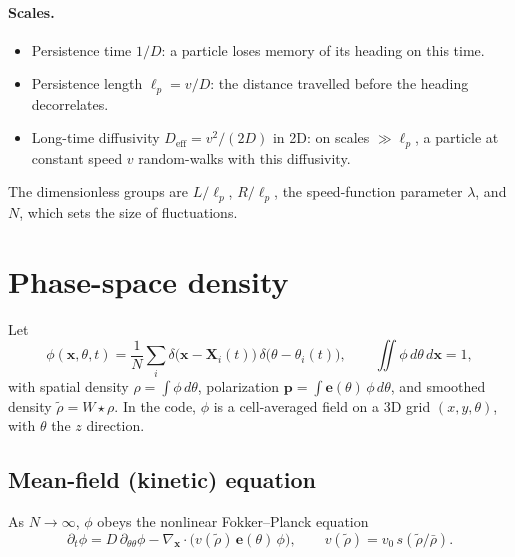 \documentclass[11pt]{article}
\newcommand{\e}{\mathbf{e}}
\newcommand{\rt}{\tilde\rho}
\newcommand{\rb}{\bar\rho}
\begin{document}
\paragraph{Scales.}
\begin{itemize}
  \item Persistence time $1/D$: a particle loses memory of its heading on this
        time.
  \item Persistence length $\ell_p = v/D$: the distance travelled before the
        heading decorrelates.
  \item Long-time diffusivity $D_{\mathrm{eff}} = v^2/(2D)$ in 2D: on scales
        $\gg\ell_p$, a particle at constant speed $v$ random-walks with this
        diffusivity.
\end{itemize}
The dimensionless groups are $L/\ell_p$, $R/\ell_p$, the speed-function
parameter $\lambda$, and $N$, which sets the size of fluctuations.

\section{Phase-space density}

Let
\begin{equation}
  \phi(\mathbf{x},\theta,t) = \frac1N\sum_i
     \delta\bigl(\mathbf{x}-\mathbf{X}_i(t)\bigr)\,\delta\bigl(\theta-\theta_i(t)\bigr),
  \qquad \iint\phi\,d\theta\,d\mathbf{x} = 1 ,
\end{equation}
with spatial density $\rho = \int\phi\,d\theta$, polarization
$\mathbf{p} = \int\e(\theta)\,\phi\,d\theta$, and smoothed density
$\rt = W\star\rho$. In the code, $\phi$ is a cell-averaged field on a 3D grid
$(x,y,\theta)$, with $\theta$ the $z$ direction.

\subsection{Mean-field (kinetic) equation}
As $N\to\infty$, $\phi$ obeys the nonlinear Fokker--Planck equation
\begin{equation}
  \partial_t\phi = D\,\partial_{\theta\theta}\phi
     - \nabla_{\mathbf{x}}\cdot\bigl(v(\rt)\,\e(\theta)\,\phi\bigr),
  \qquad v(\rt) = v_0\,s(\rt/\rb).
  \label{eq:kinetic}
\end{equation}
\end{document}
